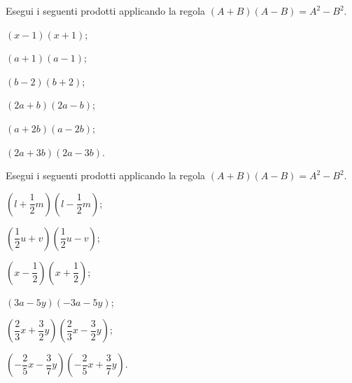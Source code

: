 \pagebreak
\begin{esercizio}
 \label{ese:11.17}
Esegui i seguenti prodotti applicando la regola
$\left(A+B\right)\left(A-B\right)=A^{2}-B^{2}$.
 \begin{multicols}{2}
\begin{enumeratea}
 \item $\left(x-1\right)\left(x+1\right)$;
 \item $\left(a+1\right)\left(a-1\right)$;
 \item $\left(b-2\right)\left(b+2\right)$;
 \item $\left(2a+b\right)\left(2a-b\right)$;
 \item $\left(a+2b\right)\left(a-2b\right)$;
 \item $\left(2a+3b\right)\left(2a-3b\right)$.
\end{enumeratea}
\end{multicols}
\end{esercizio}

\begin{esercizio}
 \label{ese:11.18}
Esegui i seguenti prodotti applicando la regola
$\left(A+B\right)\left(A-B\right)=A^{2}-B^{2}$.
 \begin{multicols}{2}
\begin{enumeratea}
 \item $\left(l+\dfrac{1}{2}m\right)\left(l-\dfrac{1}{2}m\right)$;
 \item $\left(\dfrac{1}{2}u+v\right)\left(\dfrac{1}{2}u-v\right)$;
 \item $\left(x-\dfrac{1}{2}\right)\left(x+\dfrac{1}{2}\right)$;
 \item $\left(3a-5y\right)\left(-3a-5y\right)$;
 \item $\left(\dfrac{2}{3}x+\dfrac{3}{2}y\right)\left(\dfrac{2}{3}x-\dfrac{3}{2}y\right)$;
 \item $\left(-{\dfrac{2}{5}}x-\dfrac{3}{7}y\right)\left(-{\dfrac{2}{5}}x+\dfrac{3}{7}y\right)$.
\end{enumeratea}
\end{multicols}
\end{esercizio}

